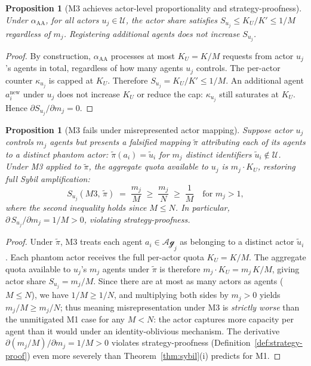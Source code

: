 \documentclass[11pt]{article}
\theoremstyle{plain}
\newtheorem{proposition}[theorem]{Proposition}
\theoremstyle{definition}
\theoremstyle{remark}
\newcommand{\Agents}{\mathcal{Ag}}         %
\newcommand{\Actors}{\mathcal{U}}          %
\newcommand{\Share}[1]{S_{#1}}             %
\newcommand{\Kcap}{K}                      %
\newcommand{\alloc}{\alpha}                %
\newcommand{\owner}{\pi}                   %
\begin{document}
\begin{proposition}[M3 achieves actor-level proportionality and strategy-proofness]
\label{prop:m3}
Under $\alloc_{\mathrm{AA}}$, for all actors $u_j \in \Actors$,
the actor share satisfies $\Share{u_j} \leq K_U / \Kcap' \leq 1/M$
regardless of $m_j$.  Registering additional agents does not increase
$\Share{u_j}$.
\end{proposition}

\begin{proof}
By construction, $\alloc_{\mathrm{AA}}$ processes at most $K_U =
\Kcap/M$ requests from actor $u_j$'s agents in total, regardless of
how many agents $u_j$ controls.  The per-actor counter $\kappa_{u_j}$
is capped at $K_U$.  Therefore $\Share{u_j} = K_U/\Kcap' \leq 1/M$.
An additional agent $a_i^{\mathrm{new}}$ under $u_j$ does not increase
$K_U$ or reduce the cap: $\kappa_{u_j}$ still saturates at $K_U$.
Hence $\partial \Share{u_j} / \partial m_j = 0$.
\end{proof}

\begin{proposition}[M3 fails under misrepresented actor mapping]
\label{prop:pi-misrep}
Suppose actor $u_j$ controls $m_j$ agents but presents a falsified
mapping $\tilde{\owner}$ attributing each of its agents to a distinct
phantom actor: $\tilde{\owner}(a_i) = \tilde{u}_i$ for $m_j$ distinct
identifiers $\tilde{u}_i \notin \Actors$.  Under M3 applied to
$\tilde{\owner}$, the aggregate quota available to $u_j$ is
$m_j \cdot K_U$, restoring full Sybil amplification:
\[
  \Share{u_j}(M3,\,\tilde{\owner})
  \;=\; \frac{m_j}{M}
  \;\geq\; \frac{m_j}{N}
  \;\geq\; \frac{1}{M}
  \quad \text{for } m_j > 1,
\]
where the second inequality holds since $M \leq N$.  In particular,
$\partial\,\Share{u_j}/\partial m_j = 1/M > 0$, violating
strategy-proofness.
\end{proposition}

\begin{proof}
Under $\tilde{\owner}$, M3 treats each agent $a_i \in \Agents_j$ as
belonging to a distinct actor $\tilde{u}_i$.  Each phantom actor
receives the full per-actor quota $K_U = \Kcap/M$.  The aggregate
quota available to $u_j$'s $m_j$ agents under $\tilde{\owner}$ is
therefore $m_j \cdot K_U = m_j\,\Kcap/M$, giving actor share
$\Share{u_j} = m_j/M$.  Since there are at most as many actors as
agents ($M \leq N$), we have $1/M \geq 1/N$, and multiplying both
sides by $m_j > 0$ yields $m_j/M \geq m_j/N$;  thus
meaning misrepresentation under M3 is \emph{strictly worse} than the
unmitigated M1 case for any $M < N$: the actor captures more capacity
per agent than it would under an identity-oblivious mechanism.
The derivative $\partial(m_j/M)/\partial m_j = 1/M > 0$ violates
strategy-proofness (Definition~\ref{def:strategy-proof}) even more
severely than Theorem~\ref{thm:sybil}(i) predicts for M1.
\end{proof}
\end{document}
